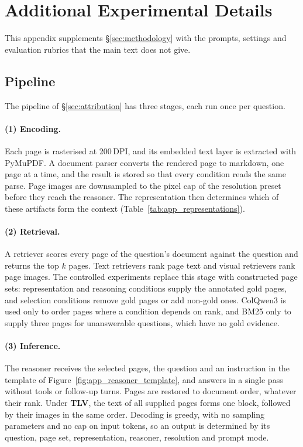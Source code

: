 \raggedbottom
\section{Additional Experimental Details}
\label{app:full_experimental_detail}

This appendix supplements \S\ref{sec:methodology} with the prompts, settings and evaluation rubrics that the main text does not give.

\subsection{Pipeline}
\label{app:attribution}



The pipeline of \S\ref{sec:attribution} has three stages, each run once per question.

\paragraph{(1) Encoding.}
Each page is rasterised at 200\,DPI, and its embedded text layer is extracted with PyMuPDF. A document parser converts the rendered page to markdown, one page at a time, and the result is stored so that every condition reads the same parse. Page images are downsampled to the pixel cap of the resolution preset before they reach the reasoner. The representation then determines which of these artifacts form the context (Table~\ref{tab:app_representations}).

\paragraph{(2) Retrieval.}
A retriever scores every page of the question's document against the question and returns the top $k$ pages. Text retrievers rank page text and visual retrievers rank page images. The controlled experiments replace this stage with constructed page sets: representation and reasoning conditions supply the annotated gold pages, and selection conditions remove gold pages or add non-gold ones. ColQwen3 is used only to order pages where a condition depends on rank, and BM25 only to supply three pages for unanswerable questions, which have no gold evidence.

\paragraph{(3) Inference.}
The reasoner receives the selected pages, the question and an instruction in the template of Figure~\ref{fig:app_reasoner_template}, and answers in a single pass without tools or follow-up turns. Pages are restored to document order, whatever their rank. Under \textbf{TLV}, the text of all supplied pages forms one block, followed by their images in the same order. Decoding is greedy, with no sampling parameters and no cap on input tokens, so an output is determined by its question, page set, representation, reasoner, resolution and prompt mode.

